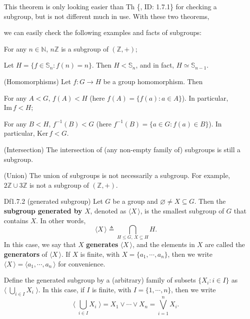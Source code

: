 \documentclass{article}
\newcommand{\Ker}{\text{Ker}\,}
\newcommand{\Ima}{\text{Im}\,}
\begin{document}
\begin{Rmk}{}
    This theorem is only looking easier than Th \{, ID: 1.7.1\} for checking a subgroup, but is not different much in use. With these two theorems, \textcolor{Th}{we can easily check the following examples and facts of subgroups:
    \begin{compactenum}
        \item For any $n\in\mathbb{N}$, $n\mathbb{Z}$ is a subgroup of $(\mathbb{Z}, +)$;
        \item Let $H = \{f\in\mathbb{S}_n: f(n) = n\}$. Then $H<\mathbb{S}_n$, and in fact, $H\simeq\mathbb{S}_{n-1}$.
        \item (Homomorphisms) Let $f: G\to H$ be a group homomorphism. Then 
        \begin{compactenum}
            \item For any $A < G$, $f(A) < H$ (here $f(A) = \{f(a): a\in A\}$). In particular, $\Ima f < H$;
            \item For any $B < H$, $f^{-1}(B) < G$ (here $f^{-1}(B) = \{a\in G: f(a)\in B\}$). In particular, $\Ker f < G$.
        \end{compactenum}
        \item (Intersection) The intersection of (any non-empty family of) subgroups is still a subgroup.
        \item (Union) The union of subgroups is not necessarily a subgroup. For example, $2\mathbb{Z}\cup 3\mathbb{Z}$ is not a subgroup of $(\mathbb{Z}, +)$.
    \end{compactenum}}
\end{Rmk}

\begin{Df}{Df1.7.2 (generated subgroup)}
    Let $G$ be a group and $\varnothing\neq X\subseteq G$. Then the \textbf{subgroup generated by $X$}, denoted as $\langle X\,\rangle$, is the smallest subgroup of $G$ that contains $X$. In other words, 
    $$ \langle X\,\rangle \triangleq \bigcap_{H\leq G,\, X\subseteq H} H. $$
    In this case, we say that $X$ \textbf{generates} $\langle X\,\rangle$, and the elements in $X$ are called the \textbf{generators} of $\langle X\,\rangle$. If $X$ is finite, with $X = \{a_1, \cdots, a_n\}$, then we write $\langle X\,\rangle = \langle a_1, \cdots, a_n\,\rangle$ for convenience.
\end{Df}

\begin{Rmk}{}
    \textcolor{Df}{Define the generated subgroup by a (arbitrary) family of subsets $\{X_i: i\in I\}$ as $\langle\; \bigcup_{i\in I} X_i\;\rangle$. In this case, if $I$ is finite, with $I = \{1, \cdots, n\}$, then we write
    $$ \langle\; \bigcup_{i\in I} X_i\;\rangle = X_1\vee\cdots\vee X_n = \bigvee_{i=1}^n X_i. $$}
\end{Rmk}
\end{document}
